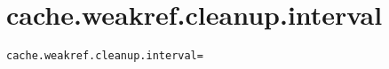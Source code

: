 \section{cache.weakref.cleanup.interval}
\label{configuration:CacheWeakrefCleanupInterval}
\ClearAPI
\TODO
{}
\begin{lstlisting}[style=Props,caption={Usage example for \textit{cache.weakref.cleanup.interval}}]
cache.weakref.cleanup.interval=
\end{lstlisting}